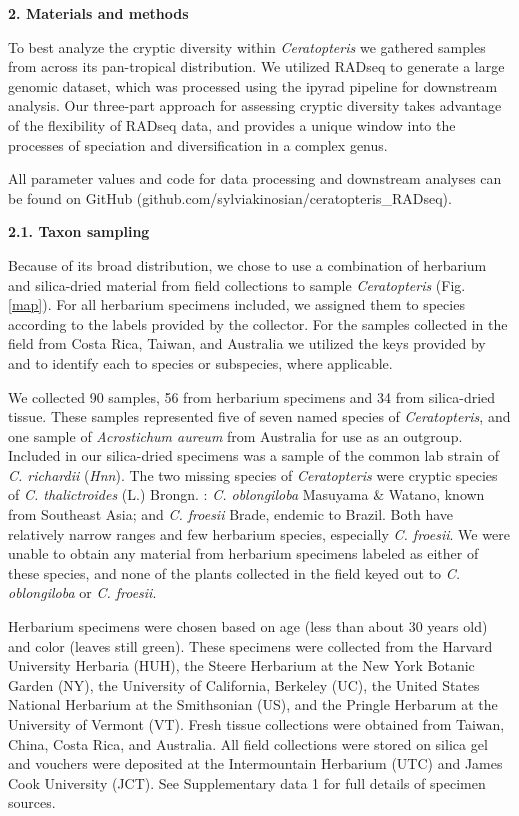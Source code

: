 \documentclass[12pt]{article}
\begin{document}
\begin{flushleft}
\vspace{1cm}

{\large\textbf{2. Materials and methods}}

To best analyze the cryptic diversity within \textit{Ceratopteris} we gathered samples from across its pan-tropical distribution. We utilized RADseq to generate a large genomic dataset, which was processed using the ipyrad pipeline \autocite{Eaton2020} for downstream analysis. Our three-part approach for assessing cryptic diversity takes advantage of the flexibility of RADseq data, and provides a unique window into the processes of speciation and diversification in a complex genus. 

All parameter values and code for data processing and downstream analyses can be found on GitHub (github.com/sylviakinosian/ceratopteris\_RADseq).

\textbf{2.1. Taxon sampling}

Because of its broad distribution, we chose to use a combination of herbarium and silica-dried material from field collections to sample \textit{Ceratopteris} (Fig. \ref{map}). For all herbarium specimens included, we assigned them to species according to the labels provided by the collector. For the samples collected in the field from Costa Rica, Taiwan, and Australia we utilized the keys provided by \textcite{LloydTax1974} and \textcite{Masuyama2010} to identify each to species or subspecies, where applicable. 

We collected 90 samples, 56 from herbarium specimens and 34 from silica-dried tissue. These samples represented five of seven named species of \textit{Ceratopteris}, and one sample of \textit{Acrostichum aureum} from Australia for use as an outgroup. Included in our silica-dried specimens was a sample of the common lab strain of \textit{C. richardii} (\textit{Hnn}). The two missing species of \textit{Ceratopteris} were cryptic species of \textit{C. thalictroides} (L.) Brongn. \autocite{Masuyama2010}: \textit{C. oblongiloba} Masuyama \& Watano, known from Southeast Asia; and \textit{C. froesii} Brade, endemic to Brazil. Both have relatively narrow ranges and few herbarium species, especially \textit{C. froesii}. We were unable to obtain any material from herbarium specimens labeled as either of these species, and none of the plants collected in the field keyed out to \textit{C. oblongiloba} or \textit{C. froesii}. 

Herbarium specimens were chosen based on age (less than about 30 years old) and color (leaves still green). These specimens were collected from the Harvard University Herbaria (HUH), the Steere Herbarium at the New York Botanic Garden (NY), the University of California, Berkeley (UC), the United States National Herbarium at the Smithsonian (US), and the Pringle Herbarum at the University of Vermont (VT). Fresh tissue collections were obtained from Taiwan, China, Costa Rica, and Australia. All field collections were stored on silica gel and vouchers were deposited at the Intermountain Herbarium (UTC) and James Cook University (JCT). See Supplementary data 1 for full details of specimen sources.


\end{flushleft}
\end{document}
